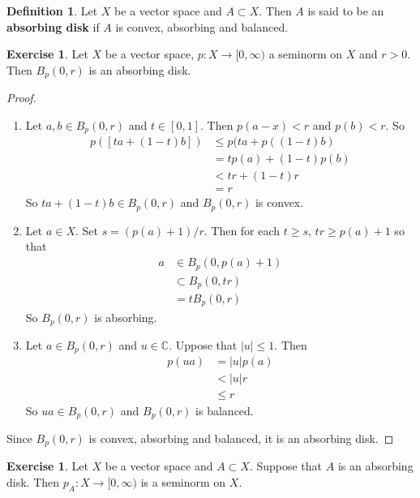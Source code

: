 \documentclass[12pt]{amsart}
\theoremstyle{definition}
\newtheorem{defn}[definition]{Definition}
\newtheorem{ex}[definition]{Exercise}
\newcommand{\C}{\mathbb{C}}
\newcommand{\Rg}{[0,\infty)}
\begin{document}
		\begin{defn}
		Let $X$ be a vector space and $A \subset X$. Then $A$ is said to be an \textbf{absorbing disk} if $A$ is convex, absorbing and balanced.
	\end{defn}
	
	\begin{ex}
		Let $X$ be a vector space, $p :X \rightarrow \Rg$ a seminorm on $X$ and $r >0$. Then $B_p(0, r)$ is an absorbing disk.
	\end{ex}
	
	\begin{proof}\
		\begin{enumerate}
			\item Let $a, b \in B_p(0, r)$ and $t \in [0,1]$. Then $p(a - x) < r$ and $p(b) < r$. So 
			\begin{align*}
				p([ta + (1 - t)b]) 
				&\leq p(ta + p((1-t)b) \\
				&= tp(a) + (1-t)p(b) \\
				&< tr + (1-t)r \\
				&= r
			\end{align*}
			So $ta + (1 - t)b \in B_p(0, r)$ and $B_p(0, r)$ is convex.
			\item Let $a \in X$. Set $s = (p(a) + 1)/ r$. Then for each $t \geq s$, $tr \geq p(a)+1$ so that 
			\begin{align*}
				a 
				& \in B_p(0, p(a)+ 1) \\
				& \subset B_p(0, tr) \\
				& = tB_p(0, r) 
			\end{align*} 
			So $B_p(0,r)$ is absorbing.
			\item Let $a \in B_p(0, r)$ and $u \in \C$. Uppose that $|u| \leq 1$. Then
			\begin{align*}
				p(ua)
				&= |u|p(a) \\
				&< |u|r \\
				&\leq r
			\end{align*}
			So $ua \in B_p(0, r)$ and $B_p(0, r)$ is balanced. 
		\end{enumerate}
		Since $B_p(0, r)$ is convex, absorbing and balanced, it is an absorbing disk. 
	\end{proof}
	
	
	\begin{ex}
		Let $X$ be a vector space and $A \subset X$. Suppose that $A$ is an absorbing disk. Then $p_A:X \rightarrow \Rg$ is a seminorm on $X$.
	\end{ex}
	
\end{document}
